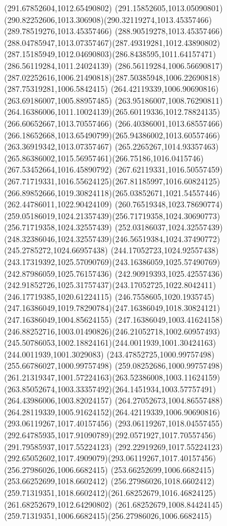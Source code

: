{{		\lineto(291.67852604,1012.65490802)
		\lineto(291.15852605,1013.05090801)
		\curveto(290.82252606,1013.306908)(290.32119274,1013.45357466)(289.78519276,1013.45357466)
		\curveto(288.90519278,1013.45357466)(288.04785947,1013.07357467)(287.49319281,1012.43890802)
		\curveto(287.15185949,1012.04690803)(286.8438595,1011.64157471)(286.56119284,1011.24024139)
		\lineto(286.56119284,1006.56690817)
		\curveto(287.02252616,1006.21490818)(287.50385948,1006.22690818)(287.75319281,1006.5842415)
		\moveto(264.42119339,1006.90690816)
		\lineto(263.69186007,1005.88957485)
		\lineto(263.95186007,1008.76290811)
		\curveto(264.16386006,1011.10024139)(265.60119336,1012.78824135)(266.60652667,1013.70557466)
		\curveto(266.40386001,1013.68557466)(266.18652668,1013.65490799)(265.94386002,1013.60557466)
		\lineto(263.36919342,1013.07357467)
		\lineto(265.2265267,1014.93357463)
		\curveto(265.86386002,1015.56957461)(266.75186,1016.0415746)(267.53452664,1016.45890792)
		\curveto(267.62119331,1016.50557459)(267.71719331,1016.55624125)(267.81185997,1016.60824125)
		\curveto(266.89852666,1019.30824118)(265.03852671,1021.54557446)(262.44786011,1022.90424109)
		\curveto(260.76519348,1023.78690774)(259.05186019,1024.21357439)(256.71719358,1024.30690773)
		\lineto(256.71719358,1024.32557439)
		\lineto(252.03186037,1024.32557439)
		\curveto(248.32386046,1024.32557439)(246.56519384,1024.37490772)(245.2785272,1024.66957438)
		\curveto(244.17052723,1024.92557438)(243.17319392,1025.57090769)(243.16386059,1025.57490769)
		\lineto(242.87986059,1025.76157436)
		\lineto(242.90919393,1025.42557436)
		\curveto(242.91852726,1025.31757437)(243.17052725,1022.8042411)(246.17719385,1020.61224115)
		\curveto(246.7558605,1020.1935745)(247.16386049,1019.78290784)(247.16386049,1018.30824121)
		\lineto(247.16386049,1004.85624155)
		\curveto(247.16386049,1003.41624158)(246.88252716,1003.01490826)(246.21052718,1002.60957493)
		\curveto(245.50786053,1002.18824161)(244.0011939,1001.30424163)(244.0011939,1001.3029083)
		\lineto(243.47852725,1000.99757498)
		\lineto(255.66786027,1000.99757498)
		\curveto(259.08252686,1000.99757498)(261.21319347,1001.57224163)(263.52386008,1003.11624159)
		\curveto(263.85052674,1003.33357492)(264.1451934,1003.57757491)(264.43986006,1003.82024157)
		\curveto(264.27052673,1004.86557488)(264.28119339,1005.91624152)(264.42119339,1006.90690816)
		\moveto(293.06119267,1017.40157456)
		\lineto(293.06119267,1018.04557455)
		\curveto(292.64785935,1017.91090789)(292.0571927,1017.70557456)(291.79585937,1017.55224123)
		\curveto(292.22919269,1017.55224123)(292.65052602,1017.4909079)(293.06119267,1017.40157456)
		\moveto(256.27986026,1006.6682415)
		\lineto(253.66252699,1006.6682415)
		\lineto(253.66252699,1018.6602412)
		\lineto(256.27986026,1018.6602412)
		\curveto(259.71319351,1018.6602412)(261.68252679,1016.46824125)(261.68252679,1012.64290802)
		\curveto(261.68252679,1008.84424145)(259.71319351,1006.6682415)(256.27986026,1006.6682415)
	}
}
